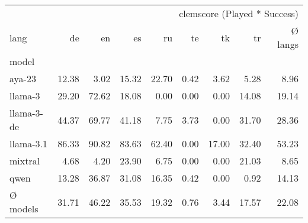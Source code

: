 \begin{tabular}{lrrrrrrrr}
\toprule
 & \multicolumn{8}{r}{clemscore (Played * Success)} \\
lang & de & en & es & ru & te & tk & tr & Ø langs \\
model &  &  &  &  &  &  &  &  \\
\midrule
aya-23 & 12.38 & 3.02 & 15.32 & 22.70 & 0.42 & 3.62 & 5.28 & 8.96 \\
llama-3 & 29.20 & 72.62 & 18.08 & 0.00 & 0.00 & 0.00 & 14.08 & 19.14 \\
llama-3-de & 44.37 & 69.77 & 41.18 & 7.75 & 3.73 & 0.00 & 31.70 & 28.36 \\
llama-3.1 & 86.33 & 90.82 & 83.63 & 62.40 & 0.00 & 17.00 & 32.40 & 53.23 \\
mixtral & 4.68 & 4.20 & 23.90 & 6.75 & 0.00 & 0.00 & 21.03 & 8.65 \\
qwen & 13.28 & 36.87 & 31.08 & 16.35 & 0.42 & 0.00 & 0.92 & 14.13 \\
Ø models & 31.71 & 46.22 & 35.53 & 19.32 & 0.76 & 3.44 & 17.57 & 22.08 \\
\bottomrule
\end{tabular}
